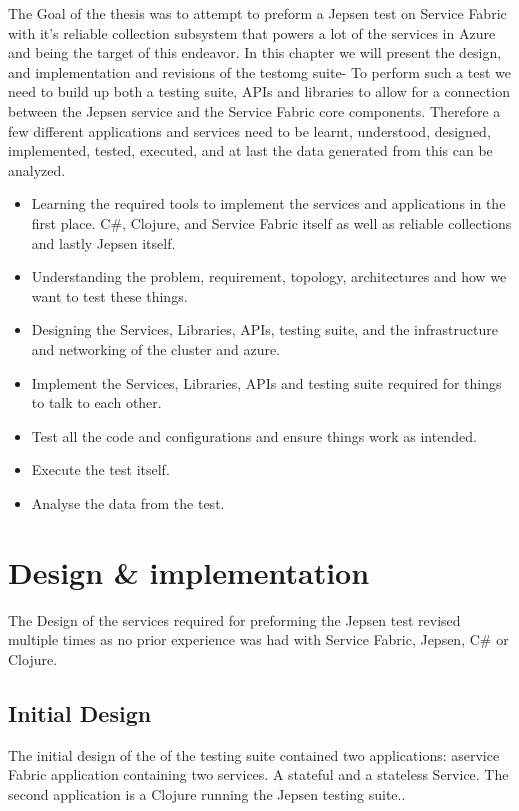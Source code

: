 \documentclass[a4paper,10pt,titlepage]{report}
\begin{document}
    The Goal of the thesis was to attempt to preform a Jepsen test on Service Fabric with it's reliable collection subsystem that powers a lot of the services in Azure and being the target of this endeavor. 
    In this chapter we will present the design, and implementation and revisions of the testomg suite-
    To perform such a test we need to build up both a testing suite, APIs and libraries to allow for a connection between the Jepsen service and the Service Fabric core components. Therefore a few different applications and services need to be learnt, understood, designed, implemented, tested, executed, and at last the data generated from this can be analyzed.
    \begin{itemize}
        \item Learning the required tools to implement the services and applications in the first place. C\#, Clojure, and Service Fabric itself as well as reliable collections and lastly Jepsen itself.
        \item Understanding the problem, requirement, topology, architectures and how we want to test these things.
        \item Designing the Services, Libraries, APIs, testing suite, and the infrastructure and networking of the cluster and azure.
        \item Implement the Services, Libraries, APIs and testing suite required for things to talk to each other.
        \item Test all the code and configurations and ensure things work as intended.
        \item Execute the test itself.
        \item Analyse the data from the test.
    \end{itemize}

   


    \section{Design \& implementation}
    The Design of the services required for preforming the Jepsen test revised multiple times as no prior experience was had with Service Fabric, Jepsen, C\# or Clojure.

    \subsection{Initial Design}

    The initial design of the of the testing suite contained two applications: aservice Fabric application containing two services. A stateful and a stateless Service. The second application is a Clojure running the Jepsen testing suite..
\end{document}
